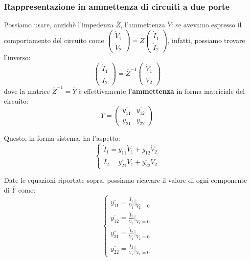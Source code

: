 \documentclass[a4paper,11pt]{article}
\begin{document}
\subsubsection{Rappresentazione in ammettenza di circuiti a due porte}
Possiamo usare, anzichè l'impedenza $\overline{Z}$, l'ammettenza $\overline{Y}$: se avevamo espresso il comportamento del circuito come $
\begin{pmatrix}
	\dot{V}_1 \\ \dot{V}_2
\end{pmatrix}
= \overline{Z}
\begin{pmatrix}
	\dot{I}_1 \\ \dot{I}_2
\end{pmatrix}
$, infatti, possiamo trovare l'inverso:
$$
\begin{pmatrix}
	\dot{I}_1 \\ \dot{I}_2
\end{pmatrix}
= \overline{Z}^{-1}
\begin{pmatrix}
	\dot{V}_1 \\ \dot{V}_2
\end{pmatrix}
$$
dove la matrice $\overline{Z}^{-1} = \overline{Y}$ è effettivamente l'\textbf{ammettenza} in forma matriciale del circuito:
$$
\overline{Y} =
\begin{pmatrix}
	\overline{y_{11}} & \overline{y_{12}} \\ 
	\overline{y_{21}} & \overline{y_{22}}
\end{pmatrix}
$$

Questo, in forma sistema, ha l'aspetto:
\[
	\begin{cases}
		\dot{I}_1 = \overline{y_{11}} \dot{V}_1 + \overline{y_{12}} \dot{V}_2 \\ 	
		\dot{I}_2 = \overline{y_{21}} \dot{V}_1 + \overline{y_{22}} \dot{V}_2 	
	\end{cases}
\]

Date le equazioni riportate sopra, possiamo ricavare il valore di ogni componente di $\overline{Y}$ come:
\[
	\begin{cases}
		\overline{y_{11}} = \frac{\dot{I}_1}{\dot{V}_1} \Big|_{\dot{V}_2 = 0} \\
		\overline{y_{12}} = \frac{\dot{I}_1}{\dot{V}_2} \Big|_{\dot{V}_1 = 0} \\
		\overline{y_{21}} = \frac{\dot{I}_2}{\dot{V}_1} \Big|_{\dot{V}_2 = 0} \\
		\overline{y_{22}} = \frac{\dot{I}_2}{\dot{V}_2} \Big|_{\dot{V}_1 = 0}
	\end{cases}
\]
\end{document}
